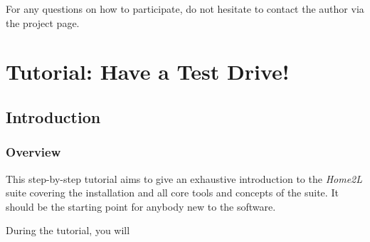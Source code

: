 \documentclass[12pt,english,parskip=half]{scrreprt}
\begin{document}
For any questions on how to participate, do not hesitate to contact the author 
via the project page.





%
%
\chapter{Tutorial: Have a Test Drive!}
\label{ch:tutorial}
%
%




\section{Introduction}
\label{sec:tutorial-intro}


\subsection{Overview}

This step-by-step tutorial aims to give an exhaustive introduction to the
\emph{Home2L} suite covering the installation and all core tools and concepts of the suite. 
It should be the starting point for anybody new to the software.

During the tutorial, you will
\end{document}
